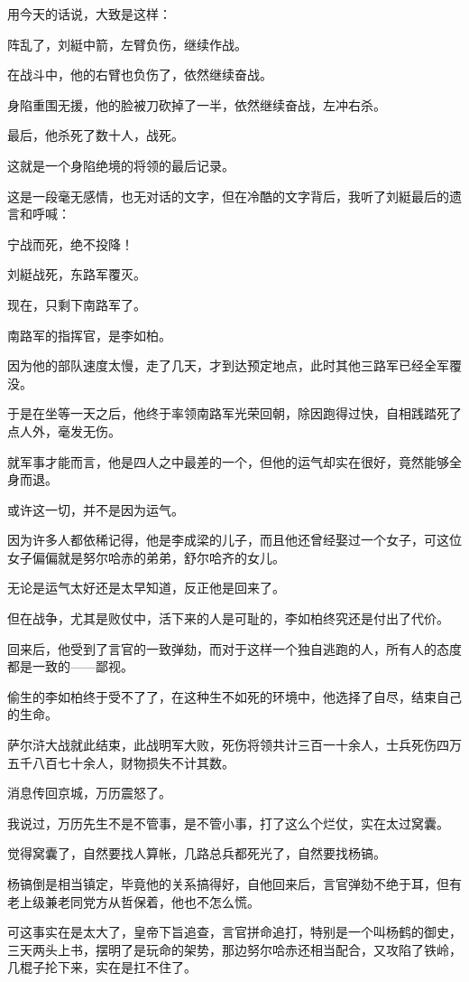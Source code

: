 \begin{multicols}{\theparacolNo}
		用今天的话说，大致是这样：

		阵乱了，刘綎中箭，左臂负伤，继续作战。

		在战斗中，他的右臂也负伤了，依然继续奋战。

		身陷重围无援，他的脸被刀砍掉了一半，依然继续奋战，左冲右杀。

		最后，他杀死了数十人，战死。

		这就是一个身陷绝境的将领的最后记录。

		这是一段毫无感情，也无对话的文字，但在冷酷的文字背后，我听了刘綎最后的遗言和呼喊：

		宁战而死，绝不投降！

		刘綎战死，东路军覆灭。

		现在，只剩下南路军了。

		南路军的指挥官，是李如柏。

		因为他的部队速度太慢，走了几天，才到达预定地点，此时其他三路军已经全军覆没。

		于是在坐等一天之后，他终于率领南路军光荣回朝，除因跑得过快，自相践踏死了点人外，毫发无伤。

		就军事才能而言，他是四人之中最差的一个，但他的运气却实在很好，竟然能够全身而退。

		或许这一切，并不是因为运气。

		因为许多人都依稀记得，他是李成梁的儿子，而且他还曾经娶过一个女子，可这位女子偏偏就是努尔哈赤的弟弟，舒尔哈齐的女儿。

		无论是运气太好还是太早知道，反正他是回来了。

		但在战争，尤其是败仗中，活下来的人是可耻的，李如柏终究还是付出了代价。

		回来后，他受到了言官的一致弹劾，而对于这样一个独自逃跑的人，所有人的态度都是一致的——鄙视。

		偷生的李如柏终于受不了了，在这种生不如死的环境中，他选择了自尽，结束自己的生命。

		萨尔浒大战就此结束，此战明军大败，死伤将领共计三百一十余人，士兵死伤四万五千八百七十余人，财物损失不计其数。

		消息传回京城，万历震怒了。

		我说过，万历先生不是不管事，是不管小事，打了这么个烂仗，实在太过窝囊。

		觉得窝囊了，自然要找人算帐，几路总兵都死光了，自然要找杨镐。

		杨镐倒是相当镇定，毕竟他的关系搞得好，自他回来后，言官弹劾不绝于耳，但有老上级兼老同党方从哲保着，他也不怎么慌。

		可这事实在是太大了，皇帝下旨追查，言官拼命追打，特别是一个叫杨鹤的御史，三天两头上书，摆明了是玩命的架势，那边努尔哈赤还相当配合，又攻陷了铁岭，几棍子抡下来，实在是扛不住了。


\end{multicols}
